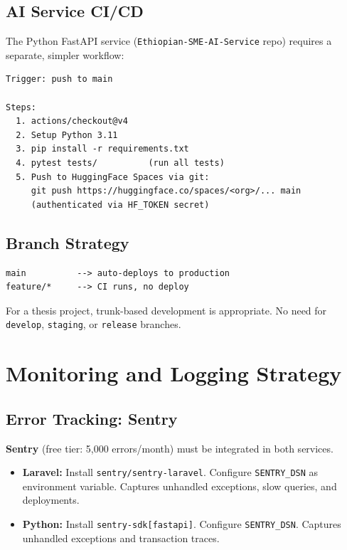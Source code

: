 \documentclass[12pt,a4paper]{report}
\begin{document}
\section{AI Service CI/CD}

The Python FastAPI service (\texttt{Ethiopian-SME-AI-Service} repo)
requires a separate, simpler workflow:

\begin{lstlisting}[caption={AI service deploy workflow}]
Trigger: push to main

Steps:
  1. actions/checkout@v4
  2. Setup Python 3.11
  3. pip install -r requirements.txt
  4. pytest tests/          (run all tests)
  5. Push to HuggingFace Spaces via git:
     git push https://huggingface.co/spaces/<org>/... main
     (authenticated via HF_TOKEN secret)
\end{lstlisting}

\section{Branch Strategy}

\begin{lstlisting}
main          --> auto-deploys to production
feature/*     --> CI runs, no deploy
\end{lstlisting}

For a thesis project, trunk-based development is appropriate. No
need for \texttt{develop}, \texttt{staging}, or \texttt{release}
branches.

\chapter{Monitoring and Logging Strategy}
\label{ch:monitoring}

\section{Error Tracking: Sentry}

\textbf{Sentry} (free tier: 5,000 errors/month) must be integrated
in both services.

\begin{itemize}[leftmargin=1.5em]
    \item \textbf{Laravel:} Install \texttt{sentry/sentry-laravel}.
          Configure \texttt{SENTRY\_DSN} as environment variable.
          Captures unhandled exceptions, slow queries, and deployments.
    \item \textbf{Python:} Install \texttt{sentry-sdk[fastapi]}.
          Configure \texttt{SENTRY\_DSN}. Captures unhandled exceptions
          and transaction traces.
\end{itemize}
\end{document}
